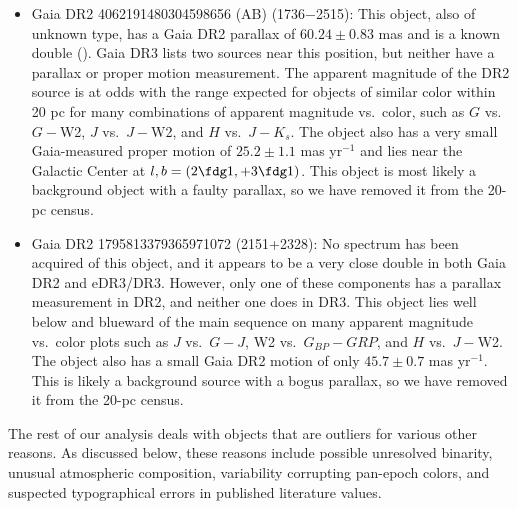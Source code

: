 \documentclass[twocolumn,tighten,twocolappendix]{aastex631}
\begin{document}
\begin{itemize}
\item Gaia DR2 4062191480304598656 (AB) (1736$-$2515): This object, also of unknown type, has a Gaia DR2 parallax of $60.24{\pm}0.83$ mas and is a known double (\citealt{vrijmoet2022}). Gaia DR3 lists two sources near this position, but neither have a parallax or proper motion measurement. The apparent magnitude of the DR2 source is at odds with the range expected for objects of similar color within 20 pc for many combinations of apparent magnitude vs.\ color, such as $G$ vs.\ $G-$W2, $J$ vs.\ $J-$W2, and $H$ vs.\ $J-K_s$. The object also has a very small Gaia-measured proper motion of $25.2{\pm}1.1$ mas yr$^{-1}$ and lies near the Galactic Center at $l,b = (2{\fdg}1,+3{\fdg}1)$. This object is most likely a background object with a faulty parallax, so we have removed it from the 20-pc census.

\item Gaia DR2 1795813379365971072 (2151+2328): No spectrum has been acquired of this object, and it appears to be a very close double in both Gaia DR2 and eDR3/DR3. However, only one of these components has a parallax measurement in DR2, and neither one does in DR3. This object lies well below and blueward of the main sequence on many apparent magnitude vs.\ color plots such as $J$ vs.\ $G-J$, W2 vs.\ $G_{BP}-G{RP}$, and $H$ vs.\ $J-$W2. The object also has a small Gaia DR2 motion of only $45.7{\pm}0.7$ mas yr$^{-1}$. This is likely a background source with a bogus parallax, so we have removed it from the 20-pc census.

\end{itemize}

The rest of our analysis deals with objects that are outliers for various other reasons. As discussed below, these reasons include possible unresolved binarity, unusual atmospheric composition, variability corrupting pan-epoch colors, and suspected typographical errors in published literature values.
\end{document}
